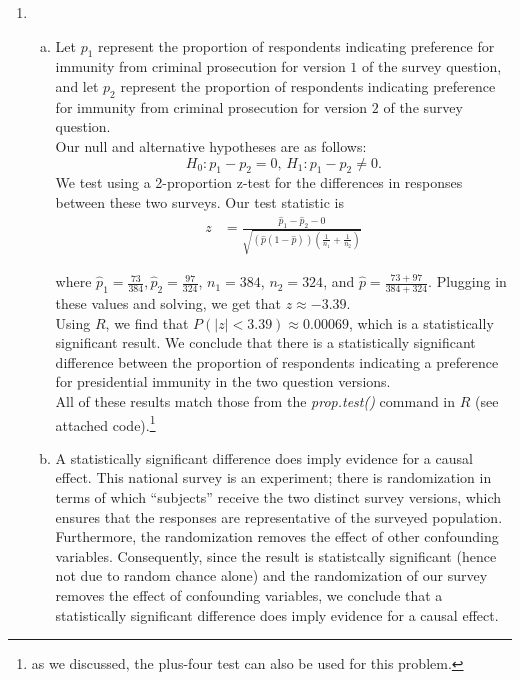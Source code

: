 \documentclass[11pt]{article}
\begin{document}
\begin{enumerate}
    \newpage

    \item \begin{enumerate}[a)]
    \item Let $p_1$ represent the proportion of respondents indicating preference for immunity from criminal prosecution for version $1$ of the survey question,
    and let $p_2$ represent the proportion of respondents indicating preference for immunity from criminal prosecution for version $2$ of the survey question. \\

    Our null and alternative hypotheses are as follows:
    \[
        H_0 \colon p_1 - p_2 = 0, \, H_1 \colon p_1 - p_2 \neq 0.
    \]
    We test using a 2-proportion z-test for the differences in responses between these two surveys. Our test statistic is
    \begin{align*}
        z &= \frac{\hat{p}_1 - \hat{p}_2 - 0}{\sqrt{(\hat{p}(1- \hat{p})) \left( \frac{1}{n_1} + \frac{1}{n_2} \right)}} 
    \end{align*}

    where $\hat{p}_1 = \frac{73}{384}, \hat{p}_2 = \frac{97}{324}$, $n_1 = 384$, $n_2 = 324$, and $\hat{p} = \frac{73 + 97}{384 + 324}$. Plugging in these values and solving,
    we get that $z \approx -3.39$. \\

    Using $R$, we find that $P(|z| < 3.39) \approx \boxed{0.00069}$, which is a statistically significant result. 
    We conclude that there is a statistically significant difference between the proportion of respondents
    indicating a preference for presidential immunity in the two question versions.\\
    
    All of these results match those from the \textit{prop.test()} command in $R$ (see attached code).\footnote{as we discussed, the plus-four test can also be
    used for this problem.}
    
    \item A statistically significant difference does imply evidence for a causal effect. 
    This national survey is an experiment; there is randomization in terms of which ``subjects'' receive the 
    two distinct survey versions, which ensures that the responses are representative of the surveyed population. 
    Furthermore, the randomization removes the effect of other confounding variables. Consequently, since the result
    is statistcally significant (hence not due to random chance alone) and the randomization of our survey removes the effect of confounding variables, 
    we conclude that a statistically significant difference does imply evidence for a causal effect. 
    \end{enumerate}


\end{enumerate}
\end{document}
